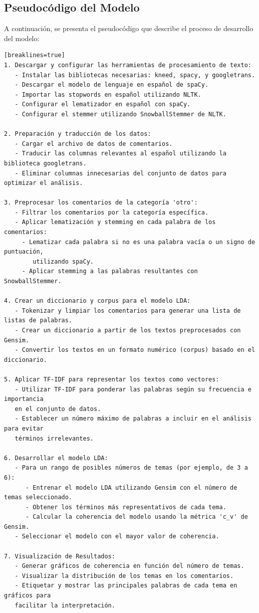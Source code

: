 \documentclass{matematicasud}
\begin{document}
\subsection{Pseudocódigo del Modelo}

A continuación, se presenta el pseudocódigo que describe el proceso de desarrollo del modelo:

    
\begin{verbatim}[breaklines=true]
1. Descargar y configurar las herramientas de procesamiento de texto:
   - Instalar las bibliotecas necesarias: kneed, spacy, y googletrans.
   - Descargar el modelo de lenguaje en español de spaCy.
   - Importar las stopwords en español utilizando NLTK.
   - Configurar el lematizador en español con spaCy.
   - Configurar el stemmer utilizando SnowballStemmer de NLTK.

2. Preparación y traducción de los datos:
   - Cargar el archivo de datos de comentarios.
   - Traducir las columnas relevantes al español utilizando la biblioteca googletrans.
   - Eliminar columnas innecesarias del conjunto de datos para optimizar el análisis.

3. Preprocesar los comentarios de la categoría 'otro':
   - Filtrar los comentarios por la categoría específica.
   - Aplicar lematización y stemming en cada palabra de los comentarios:
     - Lematizar cada palabra si no es una palabra vacía o un signo de puntuación, 
        utilizando spaCy.
     - Aplicar stemming a las palabras resultantes con SnowballStemmer.

4. Crear un diccionario y corpus para el modelo LDA:
   - Tokenizar y limpiar los comentarios para generar una lista de listas de palabras.
   - Crear un diccionario a partir de los textos preprocesados con Gensim.
   - Convertir los textos en un formato numérico (corpus) basado en el diccionario.

5. Aplicar TF-IDF para representar los textos como vectores:
   - Utilizar TF-IDF para ponderar las palabras según su frecuencia e importancia 
   en el conjunto de datos.
   - Establecer un número máximo de palabras a incluir en el análisis para evitar 
   términos irrelevantes.

6. Desarrollar el modelo LDA:
   - Para un rango de posibles números de temas (por ejemplo, de 3 a 6):
      - Entrenar el modelo LDA utilizando Gensim con el número de temas seleccionado.
      - Obtener los términos más representativos de cada tema.
      - Calcular la coherencia del modelo usando la métrica 'c_v' de Gensim.
   - Seleccionar el modelo con el mayor valor de coherencia.

7. Visualización de Resultados:
   - Generar gráficos de coherencia en función del número de temas.
   - Visualizar la distribución de los temas en los comentarios.
   - Etiquetar y mostrar las principales palabras de cada tema en gráficos para 
   facilitar la interpretación.
\end{verbatim}
\end{document}
